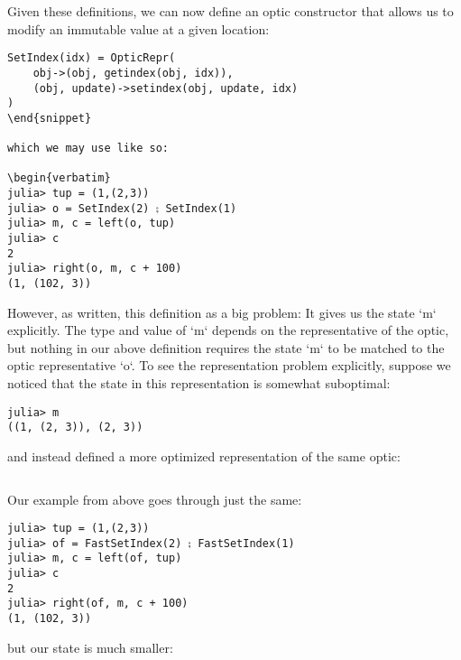 \documentclass[letterpaper, 10 pt, conference]{ieeeconf}  %
\newcounter{snippet}
\newenvironment{snippet}{
    \VerbatimEnvironment\begin{verbatim}}{\end{verbatim}\addtocounter{snippet}{1}}
\begin{document}
\inputminted[frame=lines,framesep=2mm,fontsize=\footnotesize, xleftmargin=0.5em, mathescape, linenos, label={Snippet \arabic{snippet}}, labelposition=topline]{julia}{opticdef.jl}
\addtocounter{snippet}{1}

Given these definitions, we can now define an optic constructor that allows us
to modify an immutable value at a given location:

\begin{snippet}
SetIndex(idx) = OpticRepr(
    obj->(obj, getindex(obj, idx)),
    (obj, update)->setindex(obj, update, idx)
)
\end{snippet}

which we may use like so:

\begin{verbatim}
julia> tup = (1,(2,3))
julia> o = SetIndex(2) ⨟ SetIndex(1)
julia> m, c = left(o, tup)
julia> c
2
julia> right(o, m, c + 100)
(1, (102, 3))
\end{verbatim}

However, as written, this definition as a big problem: It gives us the state `m`
explicitly. The type and value of `m` depends on the representative of the optic,
but nothing in our above definition requires the state `m` to be matched to the
optic representative `o`. To see the representation problem explicitly, suppose
we noticed that the state in this representation is somewhat suboptimal:

\begin{verbatim}
julia> m
((1, (2, 3)), (2, 3))
\end{verbatim}

and instead defined a more optimized representation of the same optic:

\inputminted[frame=lines,framesep=2mm,fontsize=\footnotesize, xleftmargin=0.5em, mathescape, linenos, label={Snippet \arabic{snippet}}, labelposition=topline]{julia}{fastsetindex.jl}
\addtocounter{snippet}{1}

Our example from above goes through just the same:

\begin{verbatim}
julia> tup = (1,(2,3))
julia> of = FastSetIndex(2) ⨟ FastSetIndex(1)
julia> m, c = left(of, tup)
julia> c
2
julia> right(of, m, c + 100)
(1, (102, 3))
\end{verbatim}

but our state is much smaller:
\end{document}
